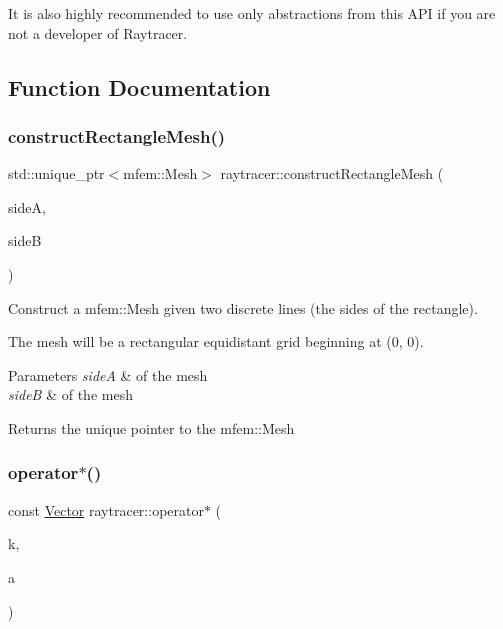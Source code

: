 It is also highly recommended to use only abstractions from this A\+PI if you are not a developer of Raytracer. 

\subsection{Function Documentation}
\mbox{\label{group__api_ga289222e1fc63a6e9126da5bbfa7b6a12}} 
\subsubsection{\texorpdfstring{construct\+Rectangle\+Mesh()}{constructRectangleMesh()}}
{\footnotesize\ttfamily std\+::unique\+\_\+ptr$<$mfem\+::\+Mesh$>$ raytracer\+::construct\+Rectangle\+Mesh (\begin{DoxyParamCaption}\item[{\hyperlink{structraytracer_1_1DiscreteLine}{Discrete\+Line}}]{sideA,  }\item[{\hyperlink{structraytracer_1_1DiscreteLine}{Discrete\+Line}}]{sideB }\end{DoxyParamCaption})}



Construct a mfem\+::\+Mesh given two discrete lines (the sides of the rectangle). 

The mesh will be a rectangular equidistant grid beginning at (0, 0).


\begin{DoxyParams}{Parameters}
{\em sideA} & of the mesh \\
\hline
{\em sideB} & of the mesh \\
\hline
\end{DoxyParams}
\begin{DoxyReturn}{Returns}
the unique pointer to the mfem\+::\+Mesh 
\end{DoxyReturn}
\mbox{\label{group__api_ga03236160eb138b0ee089b67a71d4978e}} 
\subsubsection{\texorpdfstring{operator$\ast$()}{operator*()}\hspace{0.1cm}{\footnotesize\ttfamily [1/3]}}
{\footnotesize\ttfamily const \hyperlink{classraytracer_1_1Vector}{Vector} raytracer\+::operator$\ast$ (\begin{DoxyParamCaption}\item[{double}]{k,  }\item[{\hyperlink{classraytracer_1_1Vector}{Vector}}]{a }\end{DoxyParamCaption})}



